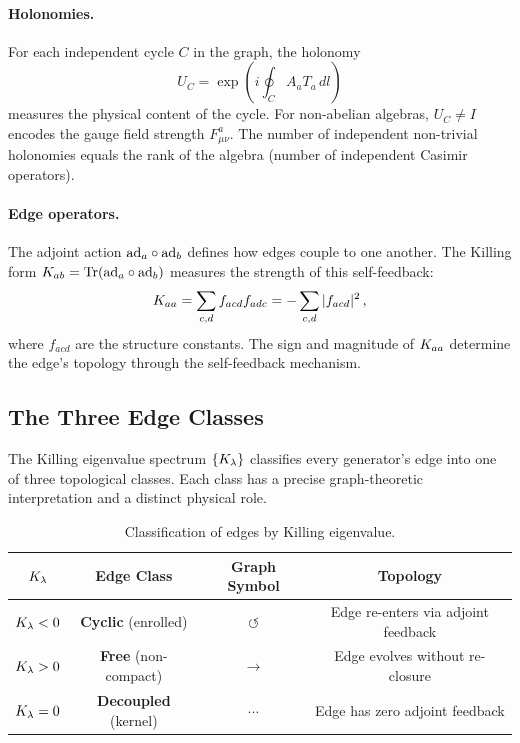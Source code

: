 \paragraph{Holonomies.} For each independent cycle $C$ in the graph, the holonomy
\begin{equation}
U_C = \exp\!\left(i \oint_C A_a T_a\,dl\right)
\end{equation}
measures the physical content of the cycle. For non-abelian algebras, $U_C \neq I$ encodes the gauge field strength $F_{\mu\nu}^a$. The number of independent non-trivial holonomies equals the rank of the algebra (number of independent Casimir operators).

\paragraph{Edge operators.} The adjoint action $\mathrm{ad}_a \circ \mathrm{ad}_b$ defines how edges couple to one another. The Killing form $K_{ab} = \mathrm{Tr}(\mathrm{ad}_a \circ \mathrm{ad}_b)$ measures the strength of this self-feedback:
\begin{equation}
K_{aa} = \sum_{c,d} f_{acd} f_{adc} = -\sum_{c,d} |f_{acd}|^2\,,
\end{equation}
where $f_{acd}$ are the structure constants. The sign and magnitude of $K_{aa}$ determine the edge's topology through the self-feedback mechanism.

\subsection{The Three Edge Classes}\label{sec:three_edge_classes}

The Killing eigenvalue spectrum $\{K_\lambda\}$ classifies every generator's edge into one of three topological classes. Each class has a precise graph-theoretic interpretation and a distinct physical role.

\begin{table}[h]
\centering
\begin{tabular}{c c c c}
\hline\hline
$K_\lambda$ & Edge Class & Graph Symbol & Topology \\
\hline
$K_\lambda < 0$ & \textbf{Cyclic} (enrolled) & $\circlearrowleft$ & Edge re-enters via adjoint feedback \\
$K_\lambda > 0$ & \textbf{Free} (non-compact) & $\rightarrow$ & Edge evolves without re-closure \\
$K_\lambda = 0$ & \textbf{Decoupled} (kernel) & $\cdots$ & Edge has zero adjoint feedback \\
\hline\hline
\end{tabular}
\caption{Classification of edges by Killing eigenvalue.}
\end{table}

